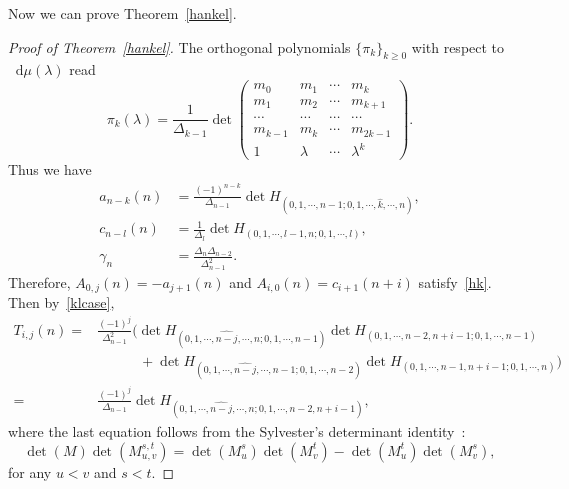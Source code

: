 \documentclass[a4paper]{article}
\theoremstyle{plain}
\theoremstyle{definition}
\newcommand{\dif}{\mathop{}\!\mathrm{d}}
\newcommand{\nn}{\nonumber}
\begin{document}
Now we can prove Theorem~\ref{hankel}.
\begin{proof}[Proof of Theorem~\ref{hankel}]
	The orthogonal polynomials $\{\pi_k\}_{k\ge0}$ with respect to $\dif\mu(\lambda)$ read
	\begin{equation}
		\pi_k(\lambda)=\frac{1}{\Delta_{k-1}}\det\begin{pmatrix}
			m_0&m_1&\cdots&m_k\\
			m_1&m_2&\cdots&m_{k+1}\\
			\cdots&\cdots&\cdots&\cdots\\
			m_{k-1}&m_k&\cdots&m_{2k-1}\\
			1&\lambda&\cdots&\lambda^k
		\end{pmatrix}.
	\end{equation}
	Thus we have
	\begin{align}
		a_{n-k}(n)&=\frac{(-1)^{n-k}}{\Delta_{n-1}}\det H_{(0,1,\cdots,n-1;0,1,\cdots,\widehat{k},\cdots,n)},\\
		c_{n-l}(n)&=\frac{1}{\Delta_l}\det H_{(0,1,\cdots,l-1,n;0,1,\cdots,l)},\\
		\gamma_n&=\frac{\Delta_n\Delta_{n-2}}{\Delta_{n-1}^2}.
	\end{align}
	Therefore, $A_{0,j}(n)=-a_{j+1}(n)$ and $A_{i,0}(n)=c_{i+1}(n+i)$ satisfy~\eqref{hk}. Then by~\eqref{klcase},
	\begin{align}
		T_{i,j}(n)=&\frac{(-1)^j}{\Delta_{n-1}^2}\biggl(\det H_{(0,1,\cdots,\widehat{n-j},\cdots,n;0,1,\cdots,n-1)}\det H_{(0,1,\cdots,n-2,n+i-1;0,1,\cdots,n-1)}\nn\\
		&\qquad\quad+\det H_{(0,1,\cdots,\widehat{n-j},\cdots,n-1;0,1,\cdots,n-2)}\det H_{(0,1,\cdots,n-1,n+i-1;0,1,\cdots,n)}\biggr)\nn\\
		=&\frac{(-1)^j}{\Delta_{n-1}}\det H_{(0,1,\cdots,\widehat{n-j},\cdots,n;0,1,\cdots,n-2,n+i-1)},
	\end{align}
	where the last equation follows from the Sylvester's determinant identity~\cite[Section 2.3]{Matrix}:
	\begin{equation}
		\det(M)\det(M_{u,v}^{s,t})=\det(M_u^s)\det(M_v^t)-\det(M_u^t)\det(M_v^s),
	\end{equation}
	for any $u<v$ and $s<t$.
	

\end{proof}
\end{document}

